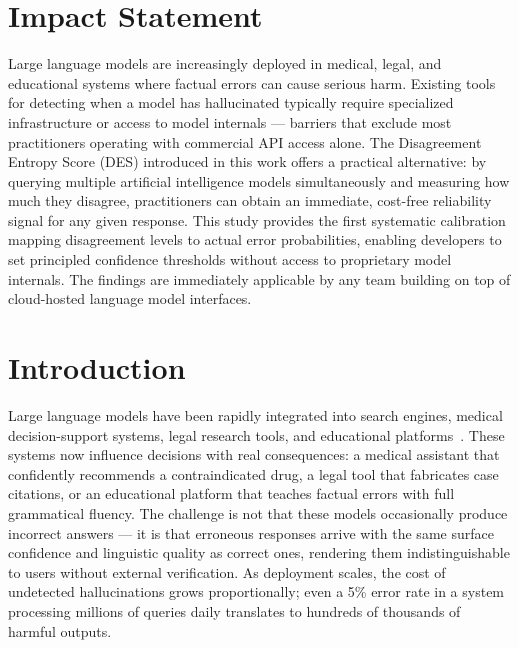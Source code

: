 \documentclass[journal]{IEEEtran}
\begin{document}
\section*{Impact Statement}

Large language models are increasingly deployed in medical, legal, and
educational systems where factual errors can cause serious harm.
Existing tools for detecting when a model has hallucinated typically
require specialized infrastructure or access to model internals --- barriers
that exclude most practitioners operating with commercial API access alone.
%
The Disagreement Entropy Score (DES) introduced in this work offers
a practical alternative: by querying multiple artificial intelligence
models simultaneously and measuring how much they disagree, practitioners
can obtain an immediate, cost-free reliability signal for any given response.
%
This study provides the first systematic calibration mapping disagreement
levels to actual error probabilities, enabling developers to set principled
confidence thresholds without access to proprietary model internals.
The findings are immediately applicable by any team building on top of
cloud-hosted language model interfaces.

\section{Introduction}
\label{sec:intro}

Large language models have been rapidly integrated into search engines,
medical decision-support systems, legal research tools, and educational
platforms~\cite{ji2023survey, huang2024hallucination}.
These systems now influence decisions with real consequences: a medical
assistant that confidently recommends a contraindicated drug, a legal
tool that fabricates case citations, or an educational platform that
teaches factual errors with full grammatical fluency.
The challenge is not that these models occasionally produce incorrect
answers --- it is that erroneous responses arrive with the same surface
confidence and linguistic quality as correct ones, rendering them
indistinguishable to users without external verification.
As deployment scales, the cost of undetected hallucinations grows
proportionally; even a 5\% error rate in a system processing millions of
queries daily translates to hundreds of thousands of harmful outputs.
\end{document}
